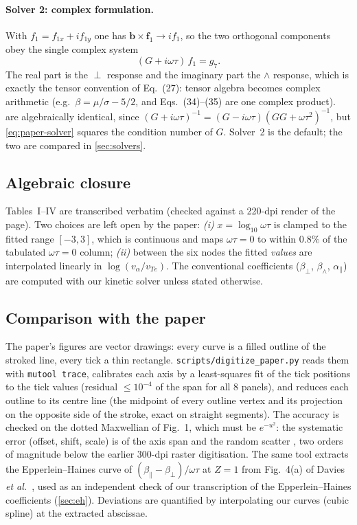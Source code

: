\documentclass[11pt,a4paper]{article}
\newcommand{\ot}{\omega\tau}
\begin{document}
\paragraph{Solver 2: complex formulation.} With $f_1=f_{1x}+if_{1y}$ one has $\mathbf b\times\mathbf f_1\to if_1$, so the
two orthogonal components obey the single complex system
\begin{equation}
   (G+i\ot)\,f_1 = g_7 . \label{eq:complex-solver}
\end{equation}
The real part is the $\perp$ response and the imaginary part the $\wedge$ response, which is exactly the tensor
convention of Eq.~(27): tensor algebra becomes complex arithmetic (e.g.\ $\beta=\mu/\sigma-5/2$, and Eqs.~(34)--(35) are one
complex product).  are algebraically identical, since
$(G+i\ot)^{-1}=(G-i\ot)(GG+\ot^2)^{-1}$, but \cref{eq:paper-solver} squares the condition number of $G$. Solver~2 is the
default; the two are compared in \cref{sec:solvers}.

\subsection{Algebraic closure}
Tables~I--IV are transcribed verbatim (checked against a 220-dpi render of the page). Two choices are left open by the
paper: \emph{(i)} $x=\log_{10}\ot$ is clamped to the fitted range $[-3,3]$, which is continuous and maps $\ot=0$ to within
$0.8\%$ of the tabulated $\ot=0$ column; \emph{(ii)} between the six nodes the fitted \emph{values} are interpolated
linearly in $\log(v_\alpha/v_{Te})$. The conventional coefficients ($\beta_\perp$, $\beta_\wedge$, $\alpha_\parallel$) are
computed with our kinetic solver unless stated otherwise.

\subsection{Comparison with the paper}\label{sec:extraction}
The paper's figures are vector drawings: every curve is a filled outline of the stroked line, every tick a thin
rectangle. \texttt{scripts/digitize\_paper.py} reads them with \texttt{mutool trace}, calibrates each axis by a
least-squares fit of the tick positions to the tick values (residual $\le10^{-4}$ of the span for all 8 panels), and
reduces each outline to its centre line (the midpoint of every outline vertex and its projection on the opposite side
of the stroke, exact on straight segments). The accuracy is checked on the dotted Maxwellian of Fig.~1, which must be
$e^{-u^2}$: the systematic error (offset, shift, scale) is \ExtractBias{} of the axis span and the random scatter
\ExtractRms{}, two orders of magnitude below the earlier 300-dpi raster digitisation. The same tool extracts the
Epperlein--Haines curve of $(\beta_\parallel-\beta_\perp)/\ot$ at $Z=1$ from Fig.~4(a) of Davies \emph{et
al.}~\cite{davies2021}, used as an independent check of our transcription of the Epperlein--Haines coefficients
(\cref{sec:eh}). Deviations are quantified by interpolating our curves (cubic spline) at the
extracted abscissae.
\end{document}
